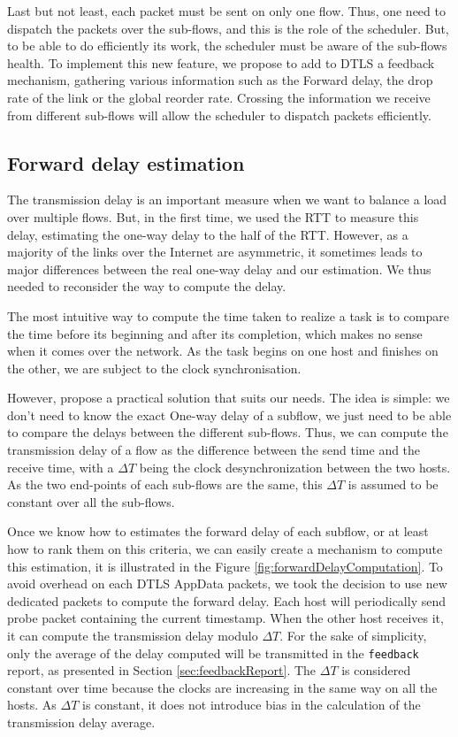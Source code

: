 \documentclass[11pt,a4paper,oldfontcommands]{memoir}
\begin{document}
Last but not least, each packet must be sent on only one flow. Thus, one need to dispatch the packets over the sub-flows, and this is the role of the scheduler. But, to be able to do efficiently its work, the scheduler must be aware of the sub-flows health. To implement this new feature, we propose to add to DTLS a feedback mechanism, gathering various information such as the Forward delay, the drop rate of the link or the global reorder rate. Crossing the information we receive from different sub-flows will allow the scheduler to dispatch packets efficiently.

\subsection{Forward delay estimation}
The transmission delay is an important measure when we want to balance a load over multiple flows. But, in the first time, we used the RTT to measure this delay, estimating the one-way delay to the half of the RTT. However, as a majority of the links over the Internet are asymmetric, it sometimes leads to major differences between the real one-way delay and our estimation. We thus needed to reconsider the way to compute the delay.

The most intuitive way to compute the time taken to realize a task is to compare the time before its beginning and after its completion, which makes no sense when it comes over the network. As the task begins on one host and finishes on the other, we are subject to the clock synchronisation.

However, \cite{song2009estimator} propose a practical solution that suits our needs. The idea is simple: we don't need to know the exact One-way delay of a subflow, we just need to be able to compare the delays between the different sub-flows. Thus, we can compute the transmission delay of a flow as the difference between the send time and the receive time, with a $\Delta T$ being the clock desynchronization between the two hosts. As the two end-points of each sub-flows are the same, this $\Delta T$ is assumed to be constant over all the sub-flows.

Once we know how to estimates the forward delay of each subflow, or at least how to rank them on this criteria, we can easily create a mechanism to compute this estimation, it is illustrated in the Figure \ref{fig:forwardDelayComputation}. To avoid overhead on each DTLS AppData packets, we took the decision to use new dedicated packets to compute the forward delay. Each host will periodically send probe packet containing the current timestamp. When the other host receives it, it can compute the transmission delay modulo $\Delta T$. For the sake of simplicity, only the average of the delay computed will be transmitted in the \verb!feedback! report, as presented in Section \ref{sec:feedbackReport}. The $\Delta T$ is considered constant over time because the clocks are increasing in the same way on all the hosts. As $\Delta T$ is constant, it does not introduce bias in the calculation of the transmission delay average.
\end{document}
